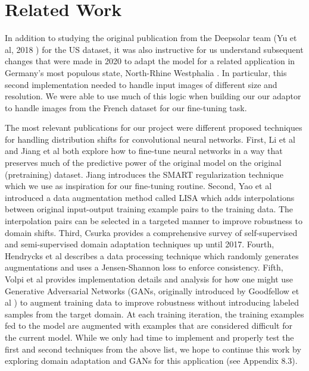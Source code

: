 \documentclass[10pt,twocolumn,letterpaper]{article}
\begin{document}

\section{Related Work}
In addition to studying the original publication from the Deepsolar team (Yu et al, 2018 \cite{DeepSolar1}) for the US dataset, it was also instructive for us understand subsequent changes that were made in 2020 to adapt the model for a related application in Germany's most populous state, North-Rhine Westphalia \cite{DeepSolar2}.  In particular, this second implementation needed to handle input images of different size and resolution. We were able to use much of this logic when building our our adaptor to handle images from the French dataset for our fine-tuning task. 

The most relevant publications for our project were different proposed techniques for handling distribution shifts for convolutional neural networks. 
First, Li et al \cite{li2021} and Jiang et al \cite{smart} both explore how to fine-tune neural networks in a way that preserves much of the predictive power of the original model on the original (pretraining) dataset. Jiang introduces the SMART regularization technique which we use as inspiration for our fine-tuning routine. Second, Yao et al \cite{yao2022improving} introduced a data augmentation method called LISA which adds interpolations between original input-output training example pairs to the training data. The interpolation pairs can be selected in a targeted manner to improve robustness to domain shifts. Third, Csurka \cite{csurka2018domain} provides a comprehensive survey of self-supervised and semi-supervised domain adaptation techniques up until 2017. Fourth, Hendrycks et al \cite{hendrycks2020augmix} describes a data processing technique which randomly generates augmentations and uses a Jensen-Shannon loss to enforce consistency. Fifth, Volpi et al \cite{volpi2018generalizing} provides implementation details and analysis for how one might use Generative Adversarial Networks (GANs, originally introduced by Goodfellow et al \cite{goodfellow2014generative}) to augment training data to improve robustness without introducing labeled samples from the target domain. At each training iteration, the training examples fed to the model are augmented with examples that are considered difficult for the current model. While we only had time to implement and properly test the first and second techniques from the above list, we hope to continue this work by exploring domain adaptation and GANs for this application (see Appendix 8.3). 
    
\end{document}
